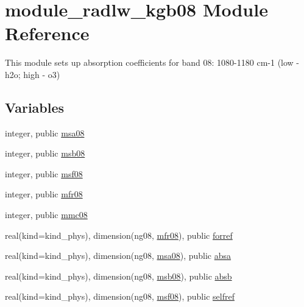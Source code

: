 \hypertarget{namespacemodule__radlw__kgb08}{}\section{module\+\_\+radlw\+\_\+kgb08 Module Reference}
\label{namespacemodule__radlw__kgb08}


This module sets up absorption coefficients for band 08\+: 1080-\/1180 cm-\/1 (low -\/ h2o; high -\/ o3)  


\subsection*{Variables}
\begin{DoxyCompactItemize}
\item 
integer, public \hyperlink{namespacemodule__radlw__kgb08_a74e4bd8f4b00d0ff6bae1a39d9bddd3b}{msa08}
\item 
integer, public \hyperlink{namespacemodule__radlw__kgb08_a3dd391fcce47d3aca3512bbfd946807b}{msb08}
\item 
integer, public \hyperlink{namespacemodule__radlw__kgb08_a7db22d5a0ece1b1f10cbf64ae1181a09}{msf08}
\item 
integer, public \hyperlink{namespacemodule__radlw__kgb08_abfaf0cad62f8ae42564f8127198d48f0}{mfr08}
\item 
integer, public \hyperlink{namespacemodule__radlw__kgb08_a9e3bfc1880221c18fa07817eb62bcc47}{mmc08}
\item 
real(kind=kind\+\_\+phys), dimension(ng08, \hyperlink{namespacemodule__radlw__kgb08_abfaf0cad62f8ae42564f8127198d48f0}{mfr08}), public \hyperlink{namespacemodule__radlw__kgb08_a8427ec5170f6a61a008a8580be6fe5ec}{forref}
\item 
real(kind=kind\+\_\+phys), dimension(ng08, \hyperlink{namespacemodule__radlw__kgb08_a74e4bd8f4b00d0ff6bae1a39d9bddd3b}{msa08}), public \hyperlink{namespacemodule__radlw__kgb08_aba1018958264bbc6fbf7f190fea91fa5}{absa}
\item 
real(kind=kind\+\_\+phys), dimension(ng08, \hyperlink{namespacemodule__radlw__kgb08_a3dd391fcce47d3aca3512bbfd946807b}{msb08}), public \hyperlink{namespacemodule__radlw__kgb08_a23d4352fcafb0394d723e2f080a84ece}{absb}
\item 
real(kind=kind\+\_\+phys), dimension(ng08, \hyperlink{namespacemodule__radlw__kgb08_a7db22d5a0ece1b1f10cbf64ae1181a09}{msf08}), public \hyperlink{namespacemodule__radlw__kgb08_a2c38561d26f86f7ae515b433843c4e5d}{selfref}
\item 

\end{DoxyCompactItemize}
